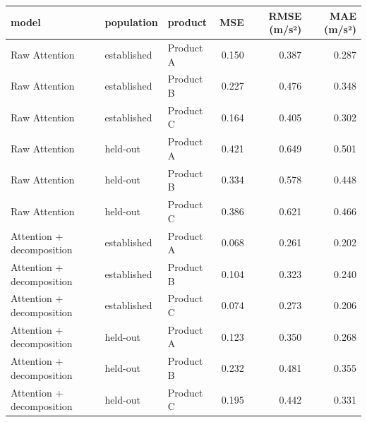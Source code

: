 \begin{tabular}{lllrrr}
\toprule
model & population & product & MSE & RMSE (m/s²) & MAE (m/s²) \\
\midrule
Raw Attention & established & Product A & 0.150 & 0.387 & 0.287 \\
Raw Attention & established & Product B & 0.227 & 0.476 & 0.348 \\
Raw Attention & established & Product C & 0.164 & 0.405 & 0.302 \\
Raw Attention & held-out & Product A & 0.421 & 0.649 & 0.501 \\
Raw Attention & held-out & Product B & 0.334 & 0.578 & 0.448 \\
Raw Attention & held-out & Product C & 0.386 & 0.621 & 0.466 \\
Attention + decomposition & established & Product A & 0.068 & 0.261 & 0.202 \\
Attention + decomposition & established & Product B & 0.104 & 0.323 & 0.240 \\
Attention + decomposition & established & Product C & 0.074 & 0.273 & 0.206 \\
Attention + decomposition & held-out & Product A & 0.123 & 0.350 & 0.268 \\
Attention + decomposition & held-out & Product B & 0.232 & 0.481 & 0.355 \\
Attention + decomposition & held-out & Product C & 0.195 & 0.442 & 0.331 \\
\bottomrule
\end{tabular}
